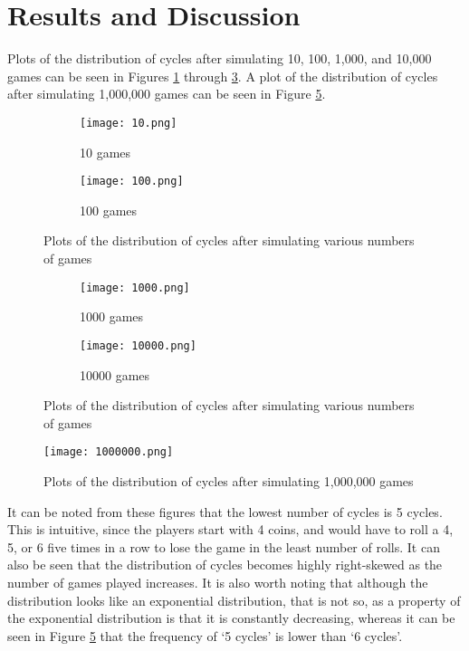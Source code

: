 \section{Results and Discussion}
\label{results}

Plots of the distribution of cycles after simulating 10, 100, 1,000, and 10,000 games can be seen in Figures \ref{fig:10} through \ref{fig:10000}. A plot of the distribution of cycles after simulating 1,000,000 games can be seen in Figure \ref{fig:1000000}.

\begin{figure}[H]
\centering
\begin{subfigure}{.5\textwidth}
  \centering
  \texttt{[image: 10.png]}
  \caption{10 games}
  \label{fig:10}
\end{subfigure}%
\begin{subfigure}{.5\textwidth}
  \centering
  \texttt{[image: 100.png]}
  \caption{100 games}
\end{subfigure}
\caption{Plots of the distribution of cycles after simulating various numbers of games}
\label{fig:dist}
\end{figure}

\begin{figure}[H]
\centering
\begin{subfigure}{.5\textwidth}
  \centering
  \texttt{[image: 1000.png]}
  \caption{1000 games}
\end{subfigure}%
\begin{subfigure}{.5\textwidth}
  \centering
  \texttt{[image: 10000.png]}
  \caption{10000 games}
  \label{fig:10000}
\end{subfigure}
\caption{Plots of the distribution of cycles after simulating various numbers of games}
\label{fig:dist}
\end{figure}

\begin{figure}[H]
\centering
\texttt{[image: 1000000.png]}
\caption{Plots of the distribution of cycles after simulating 1,000,000 games}
\label{fig:1000000}
\end{figure}

It can be noted from these figures that the lowest number of cycles is 5 cycles. This is intuitive, since the players start with 4 coins, and would have to roll a 4, 5, or 6 five times in a row to lose the game in the least number of rolls. It can also be seen that the distribution of cycles becomes highly right-skewed as the number of games played increases. It is also worth noting that although the distribution looks like an exponential distribution, that is not so, as a property of the exponential distribution is that it is constantly decreasing, whereas it can be seen in Figure \ref{fig:1000000} that the frequency of `5 cycles' is lower than `6 cycles'.

